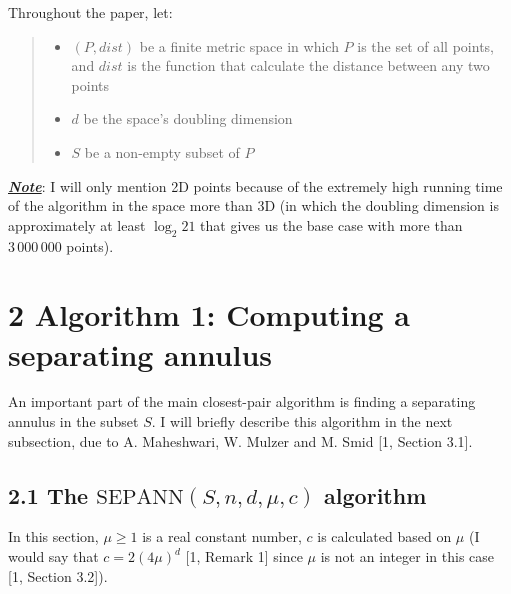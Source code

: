 \documentclass[12pt,english,]{article}
\newcommand{\pnt}[1]{{\scriptstyle#1}}
\begin{document}
\vspace{-2truemm}

Throughout the paper, let:

\vspace{-2truemm}

\begin{quote}
\begin{itemize}
\item $(P, dist)$ be a finite metric space in which $P$ is the set of all points, and $dist$ is the function that calculate the distance between any two points
\item $d$ be the space's doubling dimension
\item $S$ be a non-empty subset of $P$
\end{itemize}
\end{quote}

\vspace{-2truemm}

\underline{\emph{\textbf{Note}}}: I will only mention 2D points because
of the extremely high running time of the algorithm in the space more
than 3D (in which the doubling dimension is approximately at least
\(\log_2 21\) that gives us the base case with more than \(3\,000\,000\)
points). \unboldmath

\newpage

\hypertarget{section2}{%
\section{\texorpdfstring{2 \enspace Algorithm 1: Computing a separating
annulus}{2 Algorithm 1: Computing a separating annulus}}\label{section2}}

An important part of the main closest-pair algorithm is finding a
separating annulus in the subset \(S\). I will briefly describe this
algorithm in the next subsection, due to A. Maheshwari, W. Mulzer and M.
Smid {[}1, Section 3.1{]}.

\hypertarget{section2.1}{%
\subsection{\texorpdfstring{2.1 The
\(\mathrm{S\pnt{EP}A\pnt{NN}}(S,n,d,\mu,c)\)
algorithm}{2.1 The \textbackslash{}mathrm\{S\textbackslash{}pnt\{EP\}A\textbackslash{}pnt\{NN\}\}(S,n,d,\textbackslash{}mu,c) algorithm}}\label{section2.1}}

In this section, \(\mu \ge1\) is a real constant number, \(c\) is
calculated based on \(\mu\) (I would say that \(c = 2(4\mu)^d\) {[}1,
Remark 1{]} since \(\mu\) is not an integer in this case {[}1, Section
3.2{]}).
\end{document}
